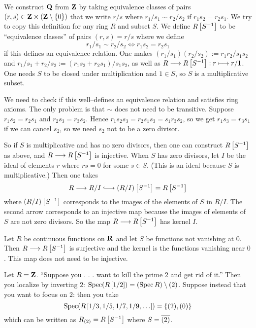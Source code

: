 \documentclass[11pt, oneside,margin=1in]{article}
\begin{document}
We construct $\mathbf Q$ from $\mathbf Z$ by taking equivalence classes of pairs $(r,s)\in \mathbf Z\times (\mathbf Z\setminus\{0\})$ that we write $r/s$ where $r_1/s_1 \sim r_2/s_2$ if $r_1s_2 = r_2s_1$. We try to copy this definition for any ring $R$ and subset $S$. We define $R\left[ S^{-1}\right]$ to be ``equivalence  classes'' of pairs $(r,s) = r/s $ where we define 
$$
r_1/s_1 \sim r_2/s_2 \iff r_1s_2 = r_2s_1
$$
if this defines an equivalence relation. One makes $(r_1/s_1)(r_2/s_2) := r_1r_2/s_1s_2$ and $r_1/s_1 + r_2/s_2 := (r_1s_2 + r_2s_1)/s_1s_2$, as well as $R \longrightarrow R\left[S^{-1}\right]:r\longmapsto r/1$. One needs $S$ to be closed under multiplication and $1\in S$, so $S$ is a multiplicative subset.

We need to check if this well--defines an equivalence relation and satisfies ring axioms. The only problem is that $\sim$ does not need to be transitive. Suppose $r_1s_2 = r_2s_1$ and $r_2s_3 = r_3s_2$. Hence $r_1s_2s_3 = r_2s_1s_3 = s_1r_3s_2$, so we get $r_1s_3 = r_3s_1$ if we can cancel $s_2$, so we need $s_2$ not to be a zero divisor. 

So if $S$ is multiplicative and has no zero divisors, then one can construct $R\left[S^{-1}\right]$ as above, and $R\longrightarrow R\left[S^{-1}\right]$ is injective. When $S$ has zero divisors, let $I$ be the ideal of elements $r$ where $rs=0$ for some $s\in S$. (This is an ideal because $S$ is multiplicative.) Then one takes
$$
R \longrightarrow R/I \lhook\joinrel\longrightarrow (R/I)\left[ S\inv\right] =R\left[ S\inv\right]
$$
where $(R/I)\left[ S^{-1}\right]$ corresponds to the images of the elements of $S$ in $R/I$. The second arrow corresponds to an injective map because the images of elements of $S$ are not zero divisors. So the map $R\longrightarrow R\left[S^{-1}\right]$ has kernel $I$.

\begin{example}
Let $R$ be continuous functions on $\mathbf R$ and let $S$ be functions not vanishing at $0$. Then $R\longrightarrow R\left[S^{-1}\right]$ is surjective and the kernel is the functions vanishing near $0$. This map does not need to be injective.
\end{example}
\begin{example}
Let $R=\mathbf Z$. ``Suppose you . . . want to kill the prime $2$ and get rid of it.'' Then you localize by inverting $2$: $\operatorname{Spec} (R\left[1/2\right]) = (\operatorname{Spec} R)\setminus(2)$. Suppose instead that you want to focus on $2$: then you take
$$
\operatorname{Spec} (R\left[ 1/3,1/5,1/7,1/9,\hdots\right]) = \{ (2), (0)\}
$$
which can be written as $R_{(2)} = R \left[S^{-1}\right]$ where $S=\overline{(2)}$. 
\end{example}
\end{document}
